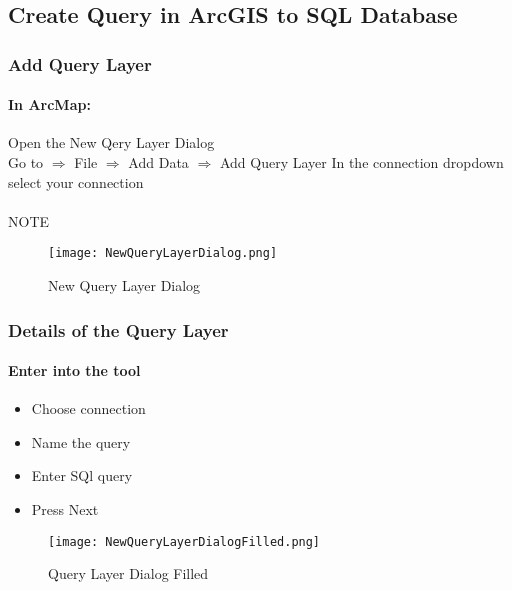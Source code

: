 \documentclass[class=article , crop=false, titlepage, twoside, multi={itemize, figure, verbatim}, float=false]{standalone}
\title{}  %
\begin{document}
\ifstandalone
\maketitle %
\tableofcontents %
\clearpage
\fi

\subsection{Create Query in ArcGIS to SQL Database}
\medskip
\subsubsection[Add Query Layer ]{\Large Add Query Layer}
\paragraph*{In ArcMap: \texorpdfstring{\\}{}}
Open the New Qery Layer Dialog\\
Go to $\Rightarrow$ File $\Rightarrow$ Add Data $\Rightarrow$ Add Query Layer
In the connection dropdown select your connection
\paragraph*{}NOTE
\begin{figure}[h!]
\centering
    \texttt{[image: NewQueryLayerDialog.png]}
\caption{New Query Layer Dialog}
\end{figure}
\clearpage
\subsubsection[Details of the Query Layer]{\Large Details of the Query Layer}
\paragraph*{Enter into the tool \texorpdfstring{\\}{}}
\begin{itemize}
  \item Choose connection
  \item Name the query
  \item Enter SQl query
  \item Press Next
\end{itemize}
\begin{figure}[h!]
\centering
    \texttt{[image: NewQueryLayerDialogFilled.png]}
\caption{Query Layer Dialog Filled}
\end{figure}
\clearpage
\end{document}
